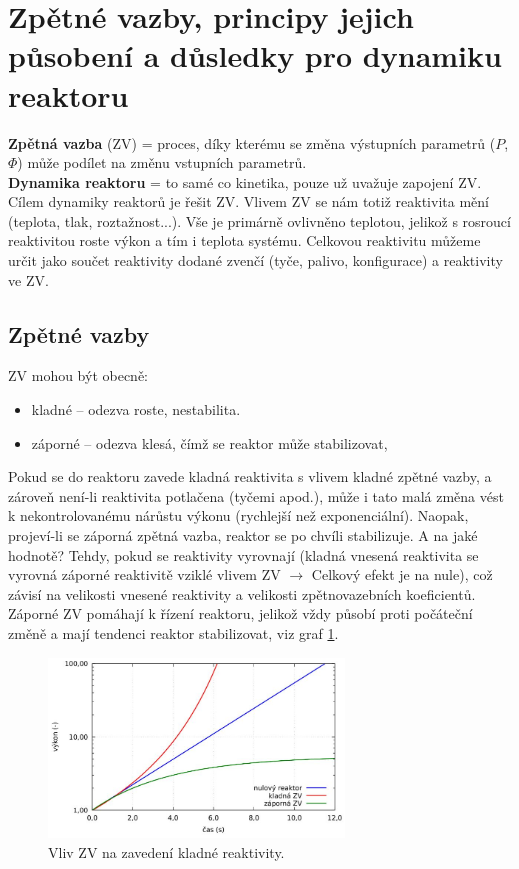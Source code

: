 \section{Zpětné vazby, principy jejich působení a důsledky pro dynamiku reaktoru}

\textbf{Zpětná vazba} (ZV) = proces, díky kterému se změna výstupních parametrů ($P$, $\Phi$) může podílet na změnu vstupních parametrů.\\

\textbf{Dynamika reaktoru} = to samé co kinetika, pouze už uvažuje zapojení ZV.\\

Cílem dynamiky reaktorů je řešit ZV. Vlivem ZV se nám totiž reaktivita mění (teplota, tlak, roztažnost...). Vše je primárně ovlivněno teplotou, jelikož s rosroucí reaktivitou roste výkon a tím i teplota systému. Celkovou reaktivitu můžeme určit jako součet reaktivity dodané zvenčí (tyče, palivo, konfigurace) a reaktivity ve ZV.\\

\subsection{Zpětné vazby}

ZV mohou být obecně:

\begin{itemize}
  \item kladné -- odezva roste, nestabilita.
  \item záporné -- odezva klesá, čímž se reaktor může stabilizovat,
\end{itemize}

Pokud se do reaktoru zavede kladná reaktivita s vlivem kladné zpětné vazby, a zároveň není-li reaktivita potlačena (tyčemi apod.), může i tato malá změna vést k nekontrolovanému nárůstu výkonu (rychlejší než exponenciální). Naopak, projeví-li se záporná zpětná vazba, reaktor se po chvíli stabilizuje. A na jaké hodnotě? Tehdy, pokud se reaktivity vyrovnají (kladná vnesená reaktivita se vyrovná záporné reaktivitě vziklé vlivem ZV $\rightarrow$ Celkový efekt je na nule), což závisí na velikosti vnesené reaktivity a velikosti zpětnovazebních koeficientů. Záporné ZV pomáhají k řízení reaktoru, jelikož vždy působí proti počáteční změně a mají tendenci reaktor stabilizovat, viz graf \ref{ZV}.

\begin{figure}[H]
  \centering
  \includegraphics[width=0.7\textwidth]{img/ZV.JPG}
  \caption{Vliv ZV na zavedení kladné reaktivity.}
  \label{ZV}
\end{figure}

